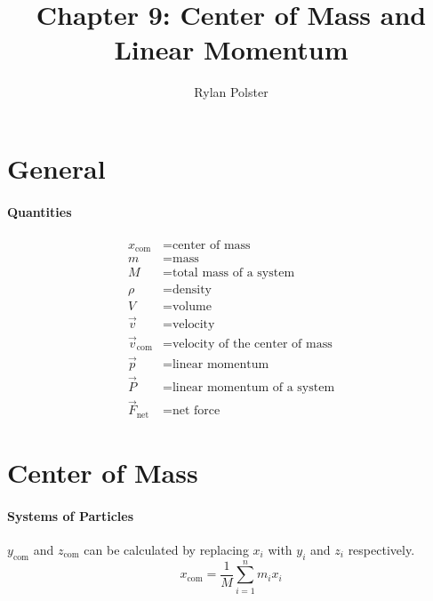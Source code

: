 \documentclass{article}
\title{Chapter 9: Center of Mass and Linear Momentum}
\author{Rylan Polster}
\begin{document}
    \maketitle

    \section*{General}

        \paragraph{Quantities}
        \begin{align}
            x_{\text{com}} &= \text{center of mass} \nonumber\\
            m &= \text{mass} \nonumber\\
            M &= \text{total mass of a system} \nonumber\\
            \rho &= \text{density} \nonumber\\
            V &= \text{volume} \nonumber\\
            \vec{v} &= \text{velocity} \nonumber\\
            \vec{v}_{\text{com}} &= \text{velocity of the center of mass} \nonumber\\
            \vec{p} &= \text{linear momentum} \nonumber\\
            \vec{P} &= \text{linear momentum of a system} \nonumber\\
            \vec{F}_{\text{net}} &= \text{net force} \nonumber
        \end{align}

    \section{Center of Mass}

        \paragraph{Systems of Particles}
        $y_{\text{com}}$ and $z_{\text{com}}$ can be calculated by replacing $x_i$ with $y_i$ and $z_i$ respectively.
        \begin{equation}
            x_{\text{com}} = \frac{1}{M} \sum_{i=1}^n m_i x_i
        \end{equation}
\end{document}
